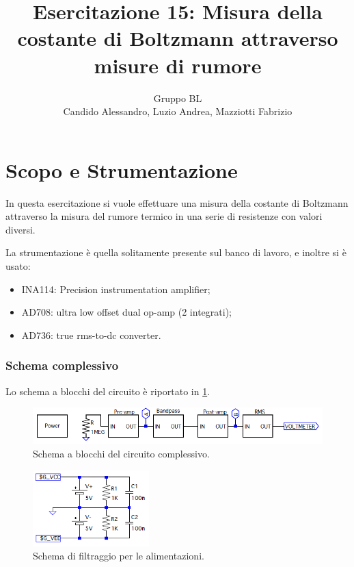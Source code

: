 \documentclass[a4paper,10pt]{article}
\title{Esercitazione 15: Misura della costante di Boltzmann attraverso misure di rumore}
\author{Gruppo BL \\ Candido Alessandro, Luzio Andrea, Mazziotti Fabrizio}
\begin{document}
\maketitle

\section{Scopo e Strumentazione}
In questa esercitazione si vuole effettuare una misura della costante di Boltzmann attraverso la
misura del rumore termico in una serie di resistenze con valori diversi.

\noindent La strumentazione è quella solitamente presente sul banco di lavoro, e inoltre si è usato:
\begin{itemize}
	\item INA114: Precision instrumentation amplifier;
	\item AD708: ultra low offset dual op-amp (2 integrati);
	\item AD736: true rms-to-dc converter.
\end{itemize}

\subsubsection*{Schema complessivo}

Lo schema a blocchi del circuito è riportato in \cref{fig:blocks}.

\begin{figure}[H]
	\centering
	\includegraphics[width=\textwidth]{../grafici/Blocks.png}
	\vspace*{10pt}
	\caption{Schema a blocchi del circuito complessivo.}
	\label{fig:blocks}
\end{figure}

\begin{figure}
	\vspace{-10pt}
	\centering
	\includegraphics[width=0.4\textwidth]{../grafici/Filter.png}
	\vspace{-6pt}
	\caption{Schema di filtraggio per le alimentazioni.}
	\label{fig:powfilter}
	\vspace{-12pt}
\end{figure}
\end{document}
